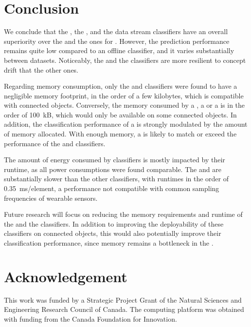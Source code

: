 \section{Conclusion}

We conclude that the \hoeffdingtree, the \mondrianforest, and the
\naivebayes data stream classifiers have an overall superiority over the
\FNN and the \mcnns ones for \har.  However, the prediction performance
remains quite low compared to an offline \knn classifier, and it varies
substantially between datasets. Noticeably, the \hoeffdingtree and the
\mcnns classifiers are more resilient to concept drift that the other ones.

Regarding memory consumption, only the \mcnn and \naivebayes classifiers
were found to have a negligible memory footprint, in the order of a few
kilobytes, which is compatible with connected objects. Conversely, the
memory consumed by a \mondrianforest, a \FNN or a \hoeffdingtree is in the
order of 100~kB, which would only be available on some connected objects.
In addition, the classification performance of a \mondrianforest is
strongly modulated by the amount of memory allocated. With enough memory, a
\mondrianforest is likely to match or exceed the performance of the
\hoeffdingtree and \naivebayes classifiers.

The amount of energy consumed by classifiers is mostly impacted by their
runtime, as all power consumptions were found comparable. The
\hoeffdingtree and \mondrianforest are substantially slower than the other
classifiers, with runtimes in the order of 0.35~ms/element, a performance not compatible 
with common sampling frequencies of wearable sensors. 

Future research will focus on reducing the memory requirements and runtime
of the \hoeffdingtree and the \mondrianforest classifiers. In addition to
improving the deployability of these classifiers on connected objects, this
would also potentially improve their classification performance, since
memory remains a bottleneck in the \mondrianforest.

\section*{Acknowledgement}
This work was funded by a Strategic Project Grant of the Natural Sciences
and Engineering Research Council of Canada. The computing platform was
obtained with funding from the Canada Foundation for Innovation.

